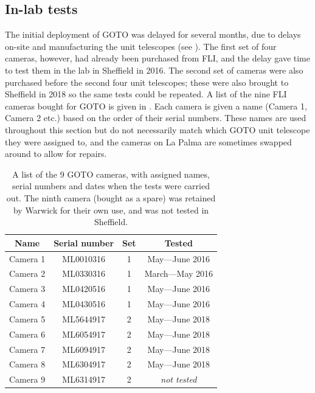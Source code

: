 
\subsection{In-lab tests}
\label{sec:camera_tests}
\begin{colsection}

The initial deployment of GOTO was delayed for several months, due to delays on-site and manufacturing the unit telescopes (see ). The first set of four cameras, however, had already been purchased from FLI, and the delay gave time to test them in the lab in Sheffield in 2016. The second set of cameras were also purchased before the second four unit telescopes; these were also brought to Sheffield in 2018 so the same tests could be repeated. A list of the nine FLI cameras bought for GOTO is given in . Each camera is given a name (Camera 1, Camera 2 etc.) based on the order of their serial numbers. These names are used throughout this section but do not necessarily match which GOTO unit telescope they were assigned to, and the cameras on La Palma are sometimes swapped around to allow for repairs.

\begin{table}[t]
    \begin{center}
        \begin{tabular}{c|ccc} %
            Name     & Serial number & Set & Tested \\
            \midrule
            Camera 1 & ML0010316     &   1 & May---June 2016     \\
            Camera 2 & ML0330316     &   1 & March---May 2016    \\
            Camera 3 & ML0420516     &   1 & May---June 2016     \\
            Camera 4 & ML0430516     &   1 & May---June 2016     \\
            Camera 5 & ML5644917     &   2 & May---June 2018     \\
            Camera 6 & ML6054917     &   2 & May---June 2018     \\
            Camera 7 & ML6094917     &   2 & May---June 2018     \\
            Camera 8 & ML6304917     &   2 & May---June 2018     \\
            Camera 9 & ML6314917     &   2 & \textit{not tested} \\
        \end{tabular}
    \end{center}
    \caption[List of GOTO cameras]{
        A list of the 9 GOTO cameras, with assigned names, serial numbers and dates when the tests were carried out. The ninth camera (bought as a spare) was retained by Warwick for their own use, and was not tested in Sheffield.
    }\label{tab:cameras}
\end{table}


\end{colsection}
